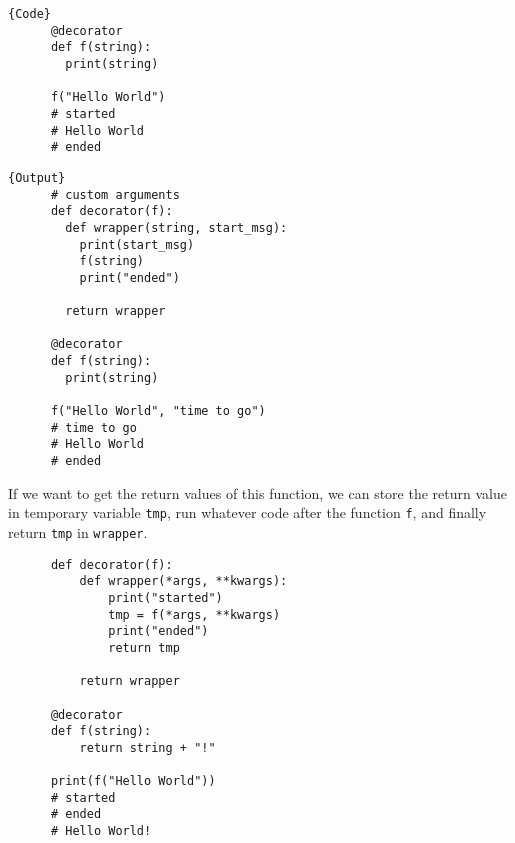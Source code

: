 \begin{definition}[Decorators]
\begin{minipage}{.5\textwidth}
\begin{lstlisting}[]{Code}
      @decorator
      def f(string): 
        print(string) 

      f("Hello World")
      # started
      # Hello World
      # ended
    \end{lstlisting}
    \end{minipage}
    \hfill
    \begin{minipage}{.49\textwidth}
    \begin{lstlisting}[]{Output}
      # custom arguments 
      def decorator(f): 
        def wrapper(string, start_msg): 
          print(start_msg) 
          f(string)
          print("ended") 

        return wrapper

      @decorator
      def f(string): 
        print(string) 

      f("Hello World", "time to go")
      # time to go
      # Hello World
      # ended
    \end{lstlisting}
    \end{minipage}
    If we want to get the return values of this function, we can store the return value in temporary variable \texttt{tmp}, run whatever code after the function \texttt{f}, and finally return \texttt{tmp} in \texttt{wrapper}. 

    \begin{lstlisting}
      def decorator(f): 
          def wrapper(*args, **kwargs): 
              print("started") 
              tmp = f(*args, **kwargs)
              print("ended") 
              return tmp

          return wrapper

      @decorator
      def f(string): 
          return string + "!"

      print(f("Hello World"))
      # started
      # ended
      # Hello World!
    \end{lstlisting}
  \end{definition}

